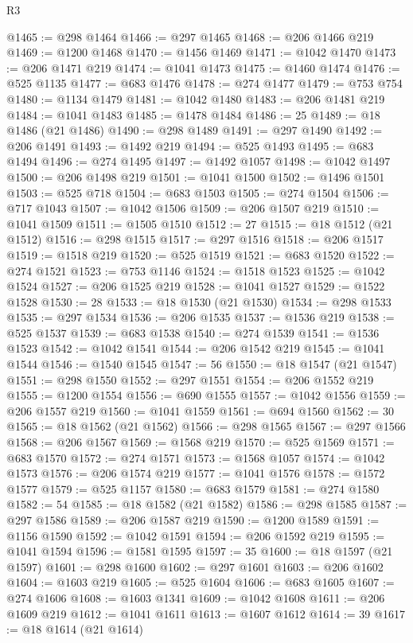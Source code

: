 \begin{lexlean}{R3}
\begin{coremodule}
@1465 := @298 @1464
@1466 := @297 @1465
@1468 := @206 @1466 @219
@1469 := @1200 @1468
@1470 := @1456 @1469
@1471 := @1042 @1470
@1473 := @206 @1471 @219
@1474 := @1041 @1473
@1475 := @1460 @1474
@1476 := @525 @1135
@1477 := @683 @1476
@1478 := @274 @1477
@1479 := @753 @754
@1480 := @1134 @1479
@1481 := @1042 @1480
@1483 := @206 @1481 @219
@1484 := @1041 @1483
@1485 := @1478 @1484
@1486 := 25
@1489 := @18 @1486 (@21 @1486)
@1490 := @298 @1489
@1491 := @297 @1490
@1492 := @206 @1491
@1493 := @1492 @219
@1494 := @525 @1493
@1495 := @683 @1494
@1496 := @274 @1495
@1497 := @1492 @1057
@1498 := @1042 @1497
@1500 := @206 @1498 @219
@1501 := @1041 @1500
@1502 := @1496 @1501
@1503 := @525 @718
@1504 := @683 @1503
@1505 := @274 @1504
@1506 := @717 @1043
@1507 := @1042 @1506
@1509 := @206 @1507 @219
@1510 := @1041 @1509
@1511 := @1505 @1510
@1512 := 27
@1515 := @18 @1512 (@21 @1512)
@1516 := @298 @1515
@1517 := @297 @1516
@1518 := @206 @1517
@1519 := @1518 @219
@1520 := @525 @1519
@1521 := @683 @1520
@1522 := @274 @1521
@1523 := @753 @1146
@1524 := @1518 @1523
@1525 := @1042 @1524
@1527 := @206 @1525 @219
@1528 := @1041 @1527
@1529 := @1522 @1528
@1530 := 28
@1533 := @18 @1530 (@21 @1530)
@1534 := @298 @1533
@1535 := @297 @1534
@1536 := @206 @1535
@1537 := @1536 @219
@1538 := @525 @1537
@1539 := @683 @1538
@1540 := @274 @1539
@1541 := @1536 @1523
@1542 := @1042 @1541
@1544 := @206 @1542 @219
@1545 := @1041 @1544
@1546 := @1540 @1545
@1547 := 56
@1550 := @18 @1547 (@21 @1547)
@1551 := @298 @1550
@1552 := @297 @1551
@1554 := @206 @1552 @219
@1555 := @1200 @1554
@1556 := @690 @1555
@1557 := @1042 @1556
@1559 := @206 @1557 @219
@1560 := @1041 @1559
@1561 := @694 @1560
@1562 := 30
@1565 := @18 @1562 (@21 @1562)
@1566 := @298 @1565
@1567 := @297 @1566
@1568 := @206 @1567
@1569 := @1568 @219
@1570 := @525 @1569
@1571 := @683 @1570
@1572 := @274 @1571
@1573 := @1568 @1057
@1574 := @1042 @1573
@1576 := @206 @1574 @219
@1577 := @1041 @1576
@1578 := @1572 @1577
@1579 := @525 @1157
@1580 := @683 @1579
@1581 := @274 @1580
@1582 := 54
@1585 := @18 @1582 (@21 @1582)
@1586 := @298 @1585
@1587 := @297 @1586
@1589 := @206 @1587 @219
@1590 := @1200 @1589
@1591 := @1156 @1590
@1592 := @1042 @1591
@1594 := @206 @1592 @219
@1595 := @1041 @1594
@1596 := @1581 @1595
@1597 := 35
@1600 := @18 @1597 (@21 @1597)
@1601 := @298 @1600
@1602 := @297 @1601
@1603 := @206 @1602
@1604 := @1603 @219
@1605 := @525 @1604
@1606 := @683 @1605
@1607 := @274 @1606
@1608 := @1603 @1341
@1609 := @1042 @1608
@1611 := @206 @1609 @219
@1612 := @1041 @1611
@1613 := @1607 @1612
@1614 := 39
@1617 := @18 @1614 (@21 @1614)

\end{coremodule}
\end{lexlean}
